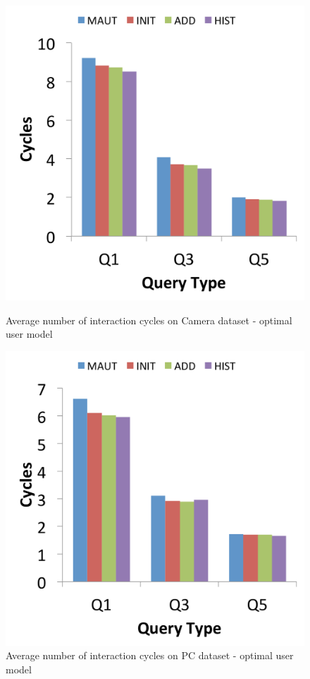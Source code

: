 \begin{figure}[h]
\centering
\begin{minipage}{.45\textwidth}
  \centering
  \includegraphics[width=1\linewidth]{figures-bharath/finalMix_camera_opt}
  \caption[]{Average number of interaction cycles on Camera dataset - optimal user model}
  \label{fig:finalMix_camera_opt}
\end{minipage}%
\;\;\;\;\;\;
\begin{minipage}{.45\textwidth}
  \centering
  \includegraphics[width=1\linewidth]{figures-bharath/finalMix_pc_opt}
  \caption[]{Average number of interaction cycles on PC dataset - optimal user model}
  \label{fig:finalMix_pc_opt}
\end{minipage}
\end{figure}

